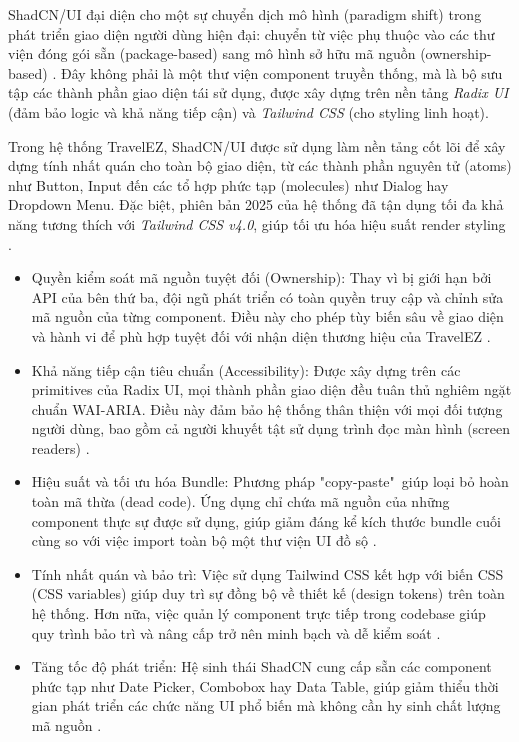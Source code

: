 
ShadCN/UI đại diện cho một sự chuyển dịch mô hình (paradigm shift) trong phát triển giao diện người dùng hiện đại: chuyển từ việc phụ thuộc vào các thư viện đóng gói sẵn (package-based) sang mô hình sở hữu mã nguồn (ownership-based) \cite{shadcn_docs}. Đây không phải là một thư viện component truyền thống, mà là bộ sưu tập các thành phần giao diện tái sử dụng, được xây dựng trên nền tảng \textit{Radix UI} (đảm bảo logic và khả năng tiếp cận) và \textit{Tailwind CSS} (cho styling linh hoạt).

Trong hệ thống TravelEZ, ShadCN/UI được sử dụng làm nền tảng cốt lõi để xây dựng tính nhất quán cho toàn bộ giao diện, từ các thành phần nguyên tử (atoms) như Button, Input đến các tổ hợp phức tạp (molecules) như Dialog hay Dropdown Menu. Đặc biệt, phiên bản 2025 của hệ thống đã tận dụng tối đa khả năng tương thích với \textit{Tailwind CSS v4.0}, giúp tối ưu hóa hiệu suất render styling \cite{tailwind_v4}.

\begin{itemize}
    \item Quyền kiểm soát mã nguồn tuyệt đối (Ownership): 
    Thay vì bị giới hạn bởi API của bên thứ ba, đội ngũ phát triển có toàn quyền truy cập và chỉnh sửa mã nguồn của từng component. Điều này cho phép tùy biến sâu về giao diện và hành vi để phù hợp tuyệt đối với nhận diện thương hiệu của TravelEZ \cite{fabrizio2025}.

    \item Khả năng tiếp cận tiêu chuẩn (Accessibility): 
    Được xây dựng trên các primitives của Radix UI, mọi thành phần giao diện đều tuân thủ nghiêm ngặt chuẩn WAI-ARIA. Điều này đảm bảo hệ thống thân thiện với mọi đối tượng người dùng, bao gồm cả người khuyết tật sử dụng trình đọc màn hình (screen readers) \cite{radix_accessibility}.

    \item Hiệu suất và tối ưu hóa Bundle: 
    Phương pháp "copy-paste"\ giúp loại bỏ hoàn toàn mã thừa (dead code). Ứng dụng chỉ chứa mã nguồn của những component thực sự được sử dụng, giúp giảm đáng kể kích thước bundle cuối cùng so với việc import toàn bộ một thư viện UI đồ sộ \cite{kitemetric2025}.

    \item Tính nhất quán và bảo trì: 
    Việc sử dụng Tailwind CSS kết hợp với biến CSS (CSS variables) giúp duy trì sự đồng bộ về thiết kế (design tokens) trên toàn hệ thống. Hơn nữa, việc quản lý component trực tiếp trong codebase giúp quy trình bảo trì và nâng cấp trở nên minh bạch và dễ kiểm soát \cite{shadcn_docs}.
    
    \item Tăng tốc độ phát triển: 
    Hệ sinh thái ShadCN cung cấp sẵn các component phức tạp như Date Picker, Combobox hay Data Table, giúp giảm thiểu thời gian phát triển các chức năng UI phổ biến mà không cần hy sinh chất lượng mã nguồn \cite{ui_comparison_2025}.
\end{itemize}

